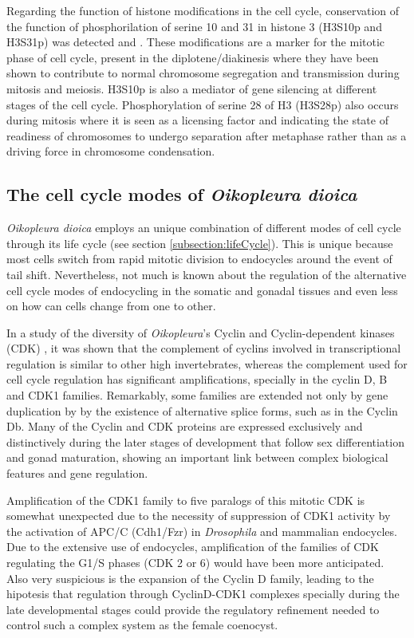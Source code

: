 \documentclass[11pt,twoside,a4paper]{report}
\begin{document}
		Regarding the function of histone modifications in the cell cycle, conservation of the function of phosphorilation of serine 10 and 31 in histone 3 (H3S10p and H3S31p) was detected \cite{Schulmeister2007} and \cite{Ganot2008}. These modifications are a marker for the mitotic phase of cell cycle, present in the diplotene/diakinesis where they have been shown to contribute to normal chromosome segregation and transmission during mitosis and meiosis. H3S10p is also a mediator of gene silencing at different stages of the cell cycle. Phosphorylation of serine 28 of H3 (H3S28p) also occurs during mitosis where it is seen as a licensing factor and indicating the state of readiness of chromosomes to undergo separation after metaphase rather than as a driving force in chromosome condensation.
					
		\subsection{The cell cycle modes of \textit{Oikopleura dioica}}
		\label{subsection:CellCycleVariants}
		\textit{Oikopleura dioica} employs an unique combination of different modes of cell cycle through its life cycle (see section \ref{subsection:lifeCycle}). This is unique because most cells switch from rapid mitotic division to endocycles around the event of tail shift. Nevertheless, not much is known about the regulation of the alternative cell cycle modes of endocycling in the somatic and gonadal tissues and even less on how can cells change from one to other.
		
		In a study of the diversity of \textit{Oikopleura}'s Cyclin and Cyclin-dependent kinases (CDK) \cite{Campsteijn2012}, it was shown that the complement of cyclins involved in transcriptional regulation is similar to other high invertebrates, whereas the complement used for cell cycle regulation has significant amplifications, specially in the cyclin D, B and CDK1 families. Remarkably, some families are extended not only by gene duplication by by the existence of alternative splice forms, such as in the Cyclin Db. Many of the Cyclin and CDK proteins are expressed exclusively and distinctively during the later stages of development that follow sex differentiation and gonad maturation, showing an important link between complex biological features and gene regulation.
		
		Amplification of the CDK1 family to five paralogs of this mitotic CDK is somewhat unexpected due to the necessity of suppression of CDK1 activity by the activation of APC/C (Cdh1/Fzr) in \textit{Drosophila} and mammalian endocycles. Due to the extensive use of endocycles, amplification of the families of CDK regulating the G1/S phases (CDK 2 or 6) would have been more anticipated. Also very suspicious is the expansion of the Cyclin D family, leading to the hipotesis that regulation through CyclinD-CDK1 complexes specially during the late developmental stages could provide the regulatory refinement needed to control such a complex system as the female coenocyst.
		
\end{document}

